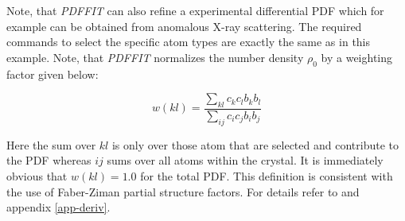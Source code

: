 Note, that {\it PDFFIT} can also refine a experimental differential PDF
which for example can be obtained from anomalous X-ray scattering. The
required commands to select the specific atom types are exactly the same
as in this example. Note, that {\it PDFFIT} normalizes the number density
$\rho_{0}$ by a weighting factor given below:

\begin{equation}
  w(kl) = \frac{\sum_{kl} c_{k}c_{l}b_{k}b_{l}}
               {\sum_{ij} c_{i}c_{j}b_{i}b_{j}}
  \label{eq_norm}
\end{equation}

Here the sum over $kl$ is only over those atom that are selected
and contribute to the PDF whereas $ij$ sums over all atoms within the
crystal. It is immediately obvious that $w(kl)=1.0$ for the total
PDF. This definition is consistent with the use of Faber-Ziman
partial structure factors. For details refer to \cite{waseda} and
appendix \ref{app-deriv}.

